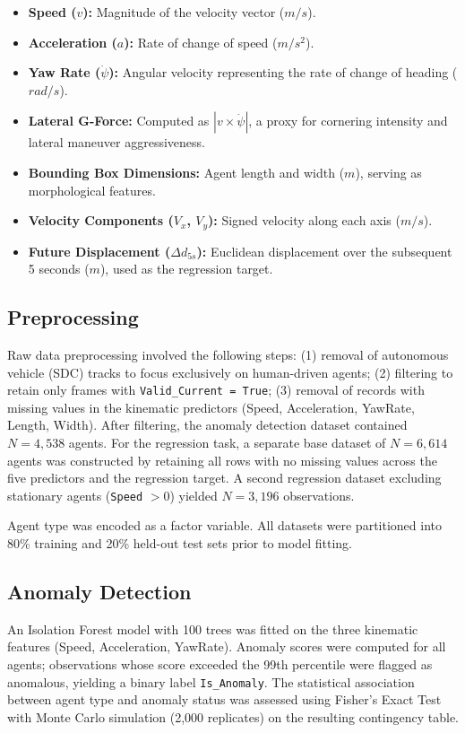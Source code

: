 \documentclass[conference]{IEEEtran}
\begin{document}
\begin{itemize}
    \item \textbf{Speed ($v$):} Magnitude of the velocity vector ($m/s$).
    \item \textbf{Acceleration ($a$):} Rate of change of speed ($m/s^2$).
    \item \textbf{Yaw Rate ($\dot{\psi}$):} Angular velocity representing the rate of change of heading ($rad/s$).
    \item \textbf{Lateral G-Force:} Computed as $|v \times \dot{\psi}|$, a proxy for cornering intensity and lateral maneuver aggressiveness.
    \item \textbf{Bounding Box Dimensions:} Agent length and width ($m$), serving as morphological features.
    \item \textbf{Velocity Components ($V_x$, $V_y$):} Signed velocity along each axis ($m/s$).
    \item \textbf{Future Displacement ($\Delta d_{5s}$):} Euclidean displacement over the subsequent 5 seconds ($m$), used as the regression target.
\end{itemize}

\subsection{Preprocessing}

Raw data preprocessing involved the following steps: (1) removal of autonomous vehicle (SDC) tracks to focus exclusively on human-driven agents; (2) filtering to retain only frames with \texttt{Valid\_Current = True}; (3) removal of records with missing values in the kinematic predictors (Speed, Acceleration, YawRate, Length, Width). After filtering, the anomaly detection dataset contained $N = 4{,}538$ agents. For the regression task, a separate base dataset of $N = 6{,}614$ agents was constructed by retaining all rows with no missing values across the five predictors and the regression target. A second regression dataset excluding stationary agents (\texttt{Speed} $> 0$) yielded $N = 3{,}196$ observations.

Agent type was encoded as a factor variable. All datasets were partitioned into 80\% training and 20\% held-out test sets prior to model fitting.

\subsection{Anomaly Detection}

An Isolation Forest model \cite{liu2008isolation} with 100 trees was fitted on the three kinematic features (Speed, Acceleration, YawRate). Anomaly scores were computed for all agents; observations whose score exceeded the 99th percentile were flagged as anomalous, yielding a binary label \texttt{Is\_Anomaly}. The statistical association between agent type and anomaly status was assessed using Fisher's Exact Test with Monte Carlo simulation (2{,}000 replicates) on the resulting contingency table.
\end{document}
